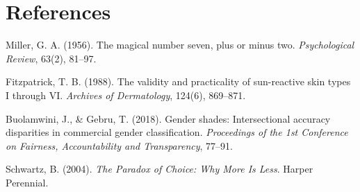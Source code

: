 \documentclass[11pt, letterpaper]{article}
\begin{document}
\section*{References}
\begin{enumerate}[leftmargin=*, label={[\arabic*]}]
    \item Miller, G. A. (1956). The magical number seven, plus or minus two. \textit{Psychological Review}, 63(2), 81--97.
    \item Fitzpatrick, T. B. (1988). The validity and practicality of sun-reactive skin types I through VI. \textit{Archives of Dermatology}, 124(6), 869--871.
    \item Buolamwini, J., \& Gebru, T. (2018). Gender shades: Intersectional accuracy disparities in commercial gender classification. \textit{Proceedings of the 1st Conference on Fairness, Accountability and Transparency}, 77--91.
    \item Schwartz, B. (2004). \textit{The Paradox of Choice: Why More Is Less}. Harper Perennial.
\end{enumerate}
\end{document}
